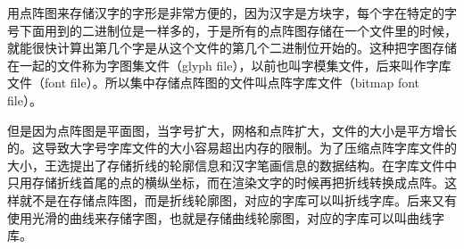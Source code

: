 \documentclass{brochure}
\begin{document}
用点阵图来存储汉字的字形是非常方便的，因为汉字是方块字，每个字在特定的字号下面用到的二进制位是一样多的，于是所有的点阵图存储在一个文件里的时候，就能很快计算出第几个字是从这个文件的第几个二进制位开始的。这种把字图存储在一起的文件称为字图集文件（glyph file），以前也叫字模集文件，后来叫作字库文件（font file）。所以集中存储点阵图的文件叫点阵字库文件（bitmap font file）。

但是因为点阵图是平面图，当字号扩大，网格和点阵扩大，文件的大小是平方增长的。这导致大字号字库文件的大小容易超出内存的限制。为了压缩点阵字库文件的大小，王选提出了存储折线的轮廓信息和汉字笔画信息的数据结构。在字库文件中只用存储折线首尾的点的横纵坐标，而在渲染文字的时候再把折线转换成点阵。这样就不是在存储点阵图，而是折线轮廓图，对应的字库可以叫折线字库。后来又有使用光滑的曲线来存储字图，也就是存储曲线轮廓图，对应的字库可以叫曲线字库。
\end{document}
